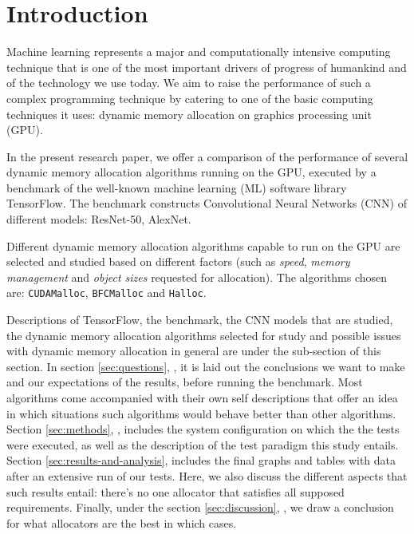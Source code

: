 \documentclass[12pt,twoside]{article}
\begin{document}

\section{Introduction}
\label{sec:introduction}

Machine learning represents a major and computationally intensive computing technique that is one of the most important drivers of progress of humankind and of the technology we use today. We aim to raise the performance of such a complex programming technique by catering to one of the basic computing techniques it uses: dynamic memory allocation on graphics processing unit (GPU).

In the present research paper, we offer a comparison of the performance of several dynamic memory allocation algorithms running on the GPU, executed by a benchmark of the well-known machine learning (ML) software library TensorFlow. The benchmark constructs Convolutional Neural Networks (CNN) of different models: ResNet-50, AlexNet.

Different dynamic memory allocation algorithms capable to run on the GPU are selected and studied based on different factors (such as \textit{speed}, \textit{memory management} and \textit{object sizes} requested for allocation). The algorithms chosen are: \texttt{CUDAMalloc}, \texttt{BFCMalloc} and \texttt{Halloc}.

Descriptions of TensorFlow, the benchmark, the CNN models that are studied, the dynamic memory allocation algorithms selected for study and possible issues with dynamic memory allocation in general are under the sub-section \textit{} of this \textit{} section. In section \ref{sec:questions}, \textit{}, it is laid out the conclusions we want to make and our expectations of the results, before running the benchmark. Most algorithms come accompanied with their own self descriptions that offer an idea in which situations such algorithms would behave better than other algorithms. Section \ref{sec:methods}, \textit{}, includes the system configuration on which the the tests were executed, as well as the description of the test paradigm this study entails. Section \ref{sec:results-and-analysis}, \textit{} includes the final graphs and tables with data after an extensive run of our tests. Here, we also discuss the different aspects that such results entail: there's no one allocator that satisfies all supposed requirements. Finally, under the section \ref{sec:discussion}, \textit{}, we draw a conclusion for what allocators are the best in which cases.
\end{document}
